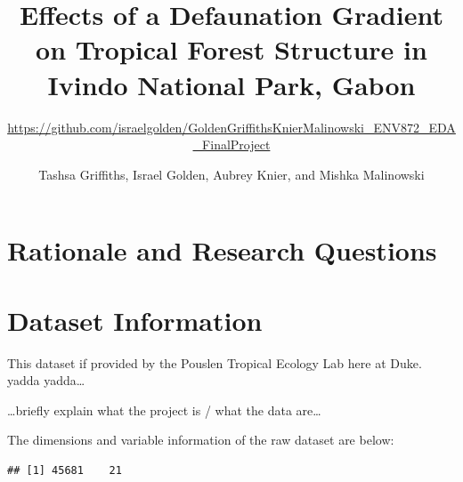 \documentclass[
  12pt,
]{article}
\title{Effects of a Defaunation Gradient on Tropical Forest Structure in Ivindo
National Park, Gabon}
\subtitle{\url{https://github.com/israelgolden/GoldenGriffithsKnierMalinowski_ENV872_EDA_FinalProject}}
\author{Tashsa Griffiths, Israel Golden, Aubrey Knier, and Mishka Malinowski}
\date{}
\begin{document}
\maketitle

\newpage
\tableofcontents 
\newpage
\listoftables 
\newpage
\listoffigures 
\newpage

\hypertarget{rationale-and-research-questions}{%
\section{Rationale and Research
Questions}\label{rationale-and-research-questions}}

\newpage

\hypertarget{dataset-information}{%
\section{Dataset Information}\label{dataset-information}}

This dataset if provided by the Pouslen Tropical Ecology Lab here at
Duke. yadda yadda\ldots{}

\ldots briefly explain what the project is / what the data are\ldots{}

The dimensions and variable information of the raw dataset are below:

\begin{verbatim}
## [1] 45681    21
\end{verbatim}
\end{document}

